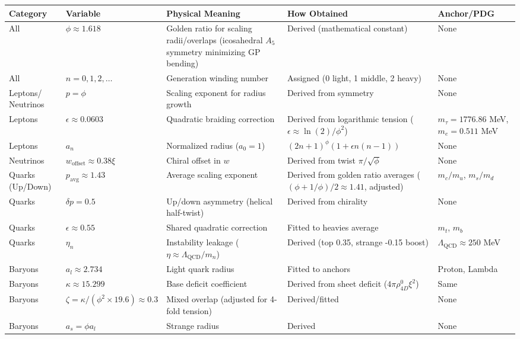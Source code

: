 \begin{sidewaystable}[p]
\centering
\begin{tabular}{|p{2cm}|p{3cm}|p{6cm}|p{6cm}|p{3cm}|}
\hline
Category & Variable & Physical Meaning & How Obtained & Anchor/PDG \\
\hline
All & $\phi \approx 1.618$ & Golden ratio for scaling radii/overlaps (icosahedral $A_5$ symmetry minimizing GP bending) & Derived (mathematical constant) & None \\
All & $n = 0,1,2,\dots$ & Generation winding number & Assigned (0 light, 1 middle, 2 heavy) & None \\
Leptons/ Neutrinos & $p = \phi$ & Scaling exponent for radius growth & Derived from symmetry & None \\
Leptons & $\epsilon \approx 0.0603$ & Quadratic braiding correction & Derived from logarithmic tension ($\epsilon \approx \ln(2)/\phi^2$) & $m_\tau=1776.86$ MeV, $m_e=0.511$ MeV \\
Leptons & $a_n$ & Normalized radius ($a_0=1$) & $(2n+1)^\phi (1 + \epsilon n(n-1))$ & None \\
Neutrinos & $w_{\text{offset}} \approx 0.38 \xi$ & Chiral offset in $w$ & Derived from twist $\pi / \sqrt{\phi}$ & None \\
Quarks (Up/Down) & $p_{\text{avg}} \approx 1.43$ & Average scaling exponent & Derived from golden ratio averages ($(\phi + 1/\phi)/2 \approx 1.41$, adjusted) & $m_c/m_u$, $m_s/m_d$ \\
Quarks & $\delta p = 0.5$ & Up/down asymmetry (helical half-twist) & Derived from chirality & None \\
Quarks & $\epsilon \approx 0.55$ & Shared quadratic correction & Fitted to heavies average & $m_t$, $m_b$ \\
Quarks & $\eta_n$ & Instability leakage ($\eta \approx \Lambda_{\text{QCD}} / m_n$) & Derived (top 0.35, strange -0.15 boost) & $\Lambda_{\text{QCD}} \approx 250$ MeV \\
Baryons & $a_l \approx 2.734$ & Light quark radius & Fitted to anchors & Proton, Lambda \\
Baryons & $\kappa \approx 15.299$ & Base deficit coefficient & Derived from sheet deficit ($4 \pi \rho_{4D}^0 \xi^2$) & Same \\
Baryons & $\zeta = \kappa / (\phi^2 \times 19.6) \approx 0.3$ & Mixed overlap (adjusted for 4-fold tension) & Derived/fitted & None \\
Baryons & $a_s = \phi a_l$ & Strange radius & Derived & None \\

\end{tabular}
\end{sidewaystable}
